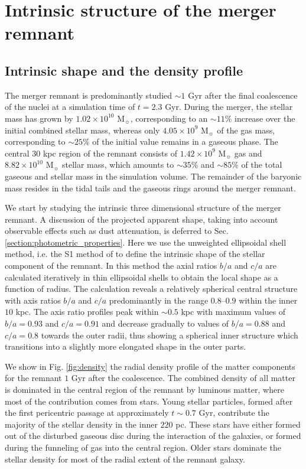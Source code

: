 \documentclass[a4paper,fleqn,usenatbib]{mnras}
\begin{document}
\section{Intrinsic structure of the merger remnant}\label{section:intrinsic_structure}

\subsection{Intrinsic shape and the density profile}\label{section:intrinsic_shape}

The merger remnant is predominantly studied $\sim1$ Gyr after the final coalescence of the nuclei at a simulation 
time of $t=2.3$ Gyr. During the merger, the stellar mass has grown by $1.02\times10^{10}$ 
M$_{\sun}$, corresponding to an $\sim11$\% increase over the initial combined stellar mass, whereas only 
$4.05\times10^{9}$ M$_{\sun}$ of the gas mass, corresponding to $\sim25$\% of the initial value remains 
in a gaseous phase. The central 30 kpc region of the remnant consists 
of $1.42\times10^{9}$ M$_{\sun}$ gas and $8.82\times10^{10}$ M$_{\sun}$ stellar 
mass, which amounts to $\sim35$\% and $\sim85$\% of the total gaseous and 
stellar mass in the simulation volume. The remainder of the baryonic mass resides in the tidal tails and 
the gaseous rings around the merger remnant. 

We start by studying the intrinsic three dimensional structure of the merger remnant. 
A discussion of the projected apparent shape, taking into account observable effects
such as dust attenuation, is deferred to Sec. \ref{section:photometric_properties}. 
Here we use the unweighted ellipsoidal shell method, i.e. the S1 method 
of \citet{2011ApJS..197...30Z} to define the intrinsic shape of the stellar component of the remnant.
In this method the axial ratios $b/a$ and $c/a$ are calculated iteratively
in thin ellipsoidal shells to obtain the local shape as a function of radius.
The calculation reveals a relatively spherical central structure with axis ratios $b/a$ and $c/a$
predominantly in the range $0.8$--$0.9$ within the inner $10$ kpc. The axis ratio profiles peak within $\sim0.5$ kpc
with maximum values of $b/a=0.93$ and $c/a=0.91$ and decrease gradually to values of $b/a=0.88$ and $c/a=0.8$ towards
the outer radii, thus showing a spherical inner structure which transitions into a slightly more elongated shape in the outer parts.

We show in Fig. \ref{fig:density} the radial density profile of the matter components for the remnant $1$ Gyr after the coalescence.
The combined density of all matter is dominated in the central region of the remnant
by luminous matter, where most of the contribution comes from stars.
Young stellar particles, formed after the first pericentric passage at approximately $t\sim 0.7$ Gyr, 
contribute the majority of the stellar density in the inner $220$ pc. These stars have either formed out of the disturbed gaseous disc
during the interaction of the galaxies, 
or formed during the funneling of gas into the central region. Older stars 
dominate the stellar density for most of the radial extent of the remnant galaxy.
\end{document}
